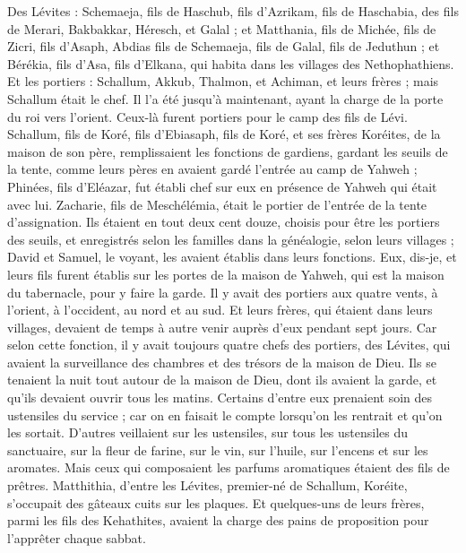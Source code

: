 \begin{multicols}{2}
Des Lévites : Schemaeja, fils de Haschub, fils d'Azrikam, fils de Haschabia, des fils de Merari,
Bakbakkar, Héresch, et Galal ; et Matthania, fils de Michée, fils de Zicri, fils d'Asaph,
Abdias fils de Schemaeja, fils de Galal, fils de Jeduthun ; et Bérékia, fils d'Asa, fils d'Elkana, qui habita dans les villages des Nethophathiens.
Et les portiers : Schallum, Akkub, Thalmon, et Achiman, et leurs frères ; mais Schallum était le chef.
Il l'a été jusqu'à maintenant, ayant la charge de la porte du roi vers l'orient. Ceux-là furent portiers pour le camp des fils de Lévi.
Schallum, fils de Koré, fils d'Ebiasaph, fils de Koré, et ses frères Koréites, de la maison de son père, remplissaient les fonctions de gardiens, gardant les seuils de la tente, comme leurs pères en avaient gardé l'entrée au camp de Yahweh ;
Phinées, fils d'Eléazar, fut établi chef sur eux en présence de Yahweh qui était avec lui.
Zacharie, fils de Meschélémia, était le portier de l'entrée de la tente d'assignation.
Ils étaient en tout deux cent douze, choisis pour être les portiers des seuils, et enregistrés selon les familles dans la généalogie, selon leurs villages ; David et Samuel, le voyant, les avaient établis dans leurs fonctions.
Eux, dis-je, et leurs fils furent établis sur les portes de la maison de Yahweh, qui est la maison du tabernacle, pour y faire la garde.
Il y avait des portiers aux quatre vents, à l'orient, à l'occident, au nord et au sud.
Et leurs frères, qui étaient dans leurs villages, devaient de temps à autre venir auprès d'eux pendant sept jours.
Car selon cette fonction, il y avait toujours quatre chefs des portiers, des Lévites, qui avaient la surveillance des chambres et des trésors de la maison de Dieu.
Ils se tenaient la nuit tout autour de la maison de Dieu, dont ils avaient la garde, et qu'ils devaient ouvrir tous les matins.
Certains d'entre eux prenaient soin des ustensiles du service ; car on en faisait le compte lorsqu'on les rentrait et qu'on les sortait.
D'autres veillaient sur les ustensiles, sur tous les ustensiles du sanctuaire, sur la fleur de farine, sur le vin, sur l'huile, sur l'encens et sur les aromates.
Mais ceux qui composaient les parfums aromatiques étaient des fils de prêtres.
Matthithia, d'entre les Lévites, premier-né de Schallum, Koréite, s'occupait des gâteaux cuits sur les plaques.
Et quelques-uns de leurs frères, parmi les fils des Kehathites, avaient la charge des pains de proposition pour l'apprêter chaque sabbat.

\end{multicols}

